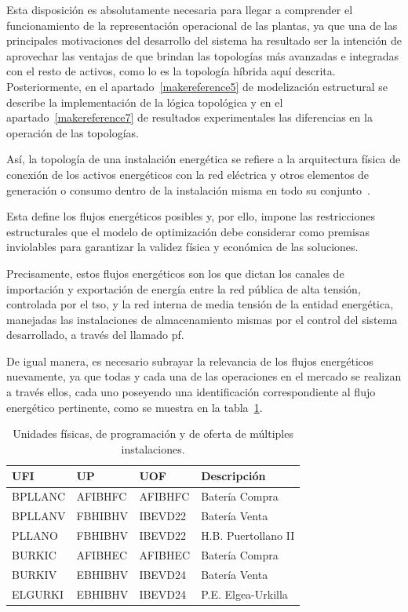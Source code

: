 Esta disposición es absolutamente necesaria para llegar a comprender el funcionamiento de la representación operacional de las plantas, ya que una de las principales motivaciones del desarrollo del sistema ha resultado ser la intención de aprovechar las ventajas de que brindan las topologías más avanzadas e integradas con el resto de activos, como lo es la topología híbrida aquí descrita. Posteriormente, en el apartado~\ref{makereference5} de modelización estructural se describe la implementación de la lógica topológica y en el apartado~\ref{makereference7} de resultados experimentales las diferencias en la operación de las topologías.

Así, la topología de una instalación energética se refiere a la arquitectura física de conexión de los activos energéticos con la red eléctrica y otros elementos de generación o consumo dentro de la instalación misma en todo su conjunto~\cite{parlikar2019topology}.

Esta define los flujos energéticos posibles y, por ello, impone las restricciones estructurales que el modelo de optimización debe considerar como premisas inviolables para garantizar la validez física y económica de las soluciones.

Precisamente, estos flujos energéticos son los que dictan los canales de importación y exportación de energía entre la red pública de alta tensión, controlada por el \gls{tso}, y la red interna de media tensión de la entidad energética, manejadas las instalaciones de almacenamiento mismas por el control del sistema desarrollado, a través del llamado \gls{pf}.

De igual manera, es necesario subrayar la relevancia de los flujos energéticos nuevamente, ya que todas y cada una de las operaciones en el mercado se realizan a través ellos, cada uno poseyendo una identificación correspondiente al flujo energético pertinente, como se muestra en la tabla~\ref{tab:unidades-fisicas}.

\begin{table}[ht]
  \centering
  \begin{tabular}{|l|l|l|l|}
    \hline
    UFI     & UP      & UOF     & Descripción         \\
    \hline
    BPLLANC & AFIBHFC & AFIBHFC & Batería Compra      \\
    BPLLANV & FBHIBHV & IBEVD22 & Batería Venta       \\
    PLLANO  & FBHIBHV & IBEVD22 & H.B. Puertollano II \\
    BURKIC  & AFIBHEC & AFIBHEC & Batería Compra      \\
    BURKIV  & EBHIBHV & IBEVD24 & Batería Venta       \\
    ELGURKI & EBHIBHV & IBEVD24 & P.E. Elgea-Urkilla  \\
    \hline
  \end{tabular}
  \caption[Unidades físicas, de programación y de oferta.]{Unidades físicas, de programación y de oferta de múltiples instalaciones.}%
  \label{tab:unidades-fisicas}
\end{table}

